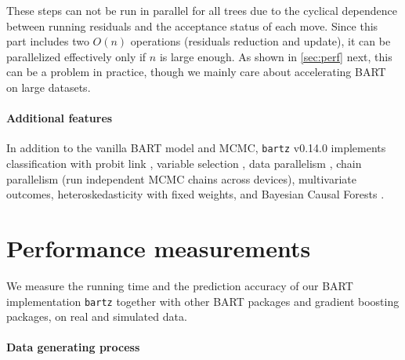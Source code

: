 \documentclass{article}
\begin{document}
These steps can not be run in parallel for all trees due to the cyclical
dependence between running residuals and the acceptance status of each move.
Since this part includes two $O(n)$ operations (residuals reduction and update),
it can be parallelized effectively only if $n$ is large enough. As shown in
\autoref{sec:perf} next, this can be a problem in practice, though
we mainly care about accelerating BART on large datasets.

\paragraph{Additional features}

In addition to the vanilla BART model and MCMC, \texttt{bartz} v0.14.0
implements classification with probit link \autocite[\S4]{chipman2010}, variable selection
\citep{linero2018}, data parallelism
\autocite[shard datapoints across devices,][]{pratola2014}, chain parallelism (run independent MCMC chains across
devices), multivariate outcomes, heteroskedasticity with fixed weights, and Bayesian Causal Forests \autocite[BCF,][]{hahn2020}.

\section{Performance measurements}
\label{sec:perf}

We measure the running time and the prediction accuracy of our BART
implementation \texttt{bartz} together with other BART packages and
gradient boosting packages, on real and simulated data.

\paragraph{Data generating process}
\end{document}
